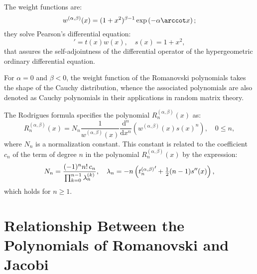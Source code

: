 \documentclass{article}
\begin{document}
The weight functions are:
\begin{equation}
  w^{(\alpha, \beta)} (x) = (1 + x^2)^{\beta - 1} \exp \left( - \alpha \arccot
  x \right) ;
\end{equation}
they solve Pearson's differential equation:
\begin{equation}
  [s (x) w (x)]' = t (x) w (x), \quad s (x) = 1 + x^2,
\end{equation}
that assures the self-adjointness of the differential operator of the
hypergeometric ordinary differential equation.

For $\alpha = 0$ and $\beta < 0$, the weight function of the Romanovski
polynomials takes the shape of the Cauchy distribution, whence the associated
polynomials are also denoted as Cauchy polynomials{\cite{Witte2000}} in their
applications in random matrix theory.{\cite{Forrester2010}}

The Rodrigues formula specifies the polynomial $R^{(\alpha, \beta)}_n (x)$ as:
\begin{equation}
  R^{(\alpha, \beta)}_n (x) = N_n  \frac{1}{w^{(\alpha, \beta)} (x)} 
  \frac{\mathrm{d}^n}{\mathrm{d} x^n}  (w^{(\alpha, \beta)} (x) s (x)^n),
  \quad 0 \leq n,
\end{equation}
where $N_n$ is a normalization constant. This constant is related to the
coefficient $c_n$ of the term of degree $n$ in the polynomial $R^{(\alpha,
\beta)}_n (x)$ by the expression:
\begin{equation}
  N_n = \frac{(- 1)^n n! \hspace{0.17em} c_n}{\prod_{k = 0}^{n - 1}
  \lambda_n^{(k)}}, \quad \lambda_n = - n \left( {t^{(\alpha, \beta)}_n}' +
  \tfrac{1}{2} (n - 1) s'' (x) \right),
\end{equation}
which holds for $n \geq 1$.

\section*{Relationship Between the Polynomials of Romanovski and Jacobi}
\end{document}
